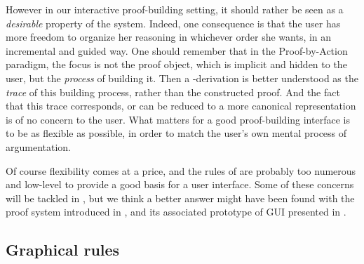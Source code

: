 However in our interactive proof-building setting, it should rather be seen as a
\emph{desirable} property of the system. Indeed, one consequence is that the
user has more freedom to organize her reasoning in whichever order she wants, in
an incremental and guided way. One should remember that in the Proof-by-Action
paradigm, the focus is not the proof object, which is implicit and hidden to the
user, but the \emph{process} of building it. Then a -derivation is
better understood as the \emph{trace} of this building process, rather than the
constructed proof. And the fact
that this trace corresponds, or can be reduced to a more canonical
representation is of no concern to the user. What matters for a good
proof-building interface is to be as flexible as possible, in order to match the
user's own mental process of argumentation.

Of course flexibility comes at a price, and the rules of  are probably
too numerous and low-level to provide a good basis for a user interface. Some of
these concerns will be tackled in , but we think a
better answer might have been found with the proof system introduced in
, and its associated prototype of GUI presented in
.


\subsection{Graphical rules}

